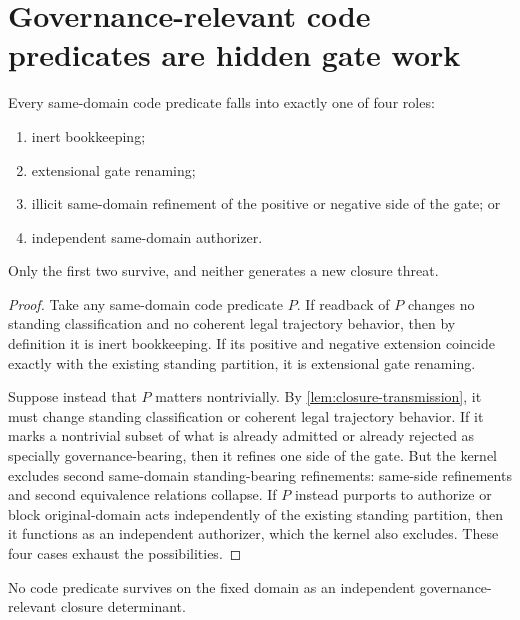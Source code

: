 \section{Governance-relevant code predicates are hidden gate work}
\label{sec:code}

\begin{theorem}
\label{thm:code-role-exhaustion}
Every same-domain code predicate falls into exactly one of four roles:
\begin{enumerate}[label=(\roman*), leftmargin=2.5em]
    \item inert bookkeeping;
    \item extensional gate renaming;
    \item illicit same-domain refinement of the positive or negative side of the gate; or
    \item independent same-domain authorizer.
\end{enumerate}
Only the first two survive, and neither generates a new closure threat.
\end{theorem}

\begin{proof}
Take any same-domain code predicate $P$. If readback of $P$ changes no standing classification and no coherent legal trajectory behavior, then by definition it is inert bookkeeping. If its positive and negative extension coincide exactly with the existing standing partition, it is extensional gate renaming.

Suppose instead that $P$ matters nontrivially. By \cref{lem:closure-transmission}, it must change standing classification or coherent legal trajectory behavior. If it marks a nontrivial subset of what is already admitted or already rejected as specially governance-bearing, then it refines one side of the gate. But the kernel excludes second same-domain standing-bearing refinements: same-side refinements and second equivalence relations collapse. If $P$ instead purports to authorize or block original-domain acts independently of the existing standing partition, then it functions as an independent authorizer, which the kernel also excludes. These four cases exhaust the possibilities.
\end{proof}

\begin{corollary}
No code predicate survives on the fixed domain as an independent governance-relevant closure determinant.
\end{corollary}

